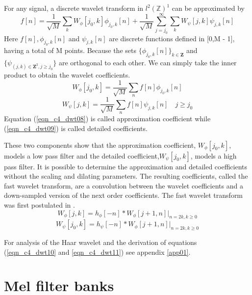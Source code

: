 For any signal, a discrete wavelet transform in $l^2(\mathbb{Z})^1$ can be approximated by
\begin{equation}
f[n]=\frac{1}{\sqrt{M}}\sum_kW_\phi[j_0,k]\phi_{j_0,k}[n]+\frac{1}{\sqrt{M}}\sum_{j=j_0}^\infty\sum_kW_\psi[j,k]\psi_{j,k}[n]
\label{eqn_c4_dwt07}
\end{equation}
Here $f[n],\phi_{j_0,k}[n]$ and $\psi_{j,k}[n]$ are discrete functions defined in [0,M - 1], having a total of M points.  Because the sets $\{\phi_{j_0,k}[n]\}_{k\in\mathbf{Z}}$ and $\{\psi_{(j,k)\in\mathbf{Z}^2,j\ge j_0}\}$ are orthogonal to each other.  We can simply take the inner product to obtain the wavelet coefficients.
\begin{equation}
W_\phi[j_0,k]=\frac{1}{\sqrt{M}}\sum_nf[n]\phi_{j_0,k}[n]
\label{eqn_c4_dwt08}
\end{equation}
\begin{equation}
W_\psi[j,k]=\frac{1}{\sqrt{M}}\sum_nf[n]\psi_{j,k}[n] \quad j\ge j_0
\label{eqn_c4_dwt09}
\end{equation}
Equation (\ref{eqn_c4_dwt08}) is called approximation coefficient while (\ref{eqn_c4_dwt09}) is called detailed coefficients.

These two components show that the approximation coefficient, $W_\phi[j_0,k]$, models a low pass filter and the detailed coefficient,$W_\psi[j_0,k]$, models a high pass filter. It is possible to determine the approximation and detailed coefficients without the scaling and dilating parameters. The resulting coefficients, called the fast wavelet transform, are a convolution between the wavelet coefficients and a down-sampled version of the next order coefficients.  The fast wavelet transform was first postulated in \citep{mallat1989theory}.
\begin{equation}
W_\phi[j,k]=h_\phi[-n]\ast W_\phi[j+1,n]|_{n=2k, k\ge 0}
\label{eqn_c4_dwt10}
\end{equation}
\begin{equation}
W_\psi[j_0,k]=h_\psi[-n]\ast W_\phi[j+1,n]|_{n=2k, k\ge 0}
\label{eqn_c4_dwt11}
\end{equation}

For analysis of the Haar wavelet and the derivation of equations (\ref{eqn_c4_dwt10} and \ref{eqn_c4_dwt11}) see appendix \ref{app01}.

\section{Mel filter banks}

